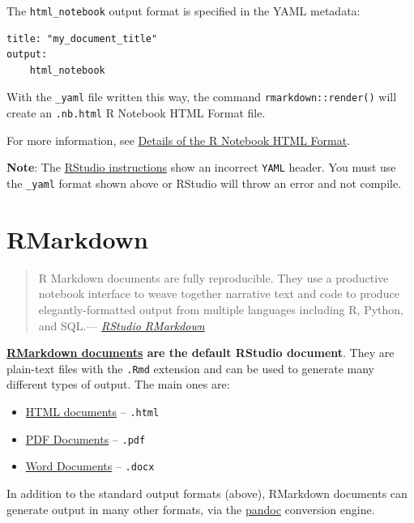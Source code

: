 \documentclass[]{book}
\providecommand{\tightlist}{%
  \setlength{\itemsep}{0pt}\setlength{\parskip}{0pt}}
\theoremstyle{definition}
\theoremstyle{definition}
\theoremstyle{definition}
\theoremstyle{remark}
\begin{document}
The \texttt{html\_notebook} output format is specified in the YAML
metadata:

\begin{verbatim}
title: "my_document_title"
output:
    html_notebook
\end{verbatim}

With the \texttt{\_yaml} file written this way, the command
\texttt{rmarkdown::render()} will create an \texttt{.nb.html} R Notebook
HTML Format file.

For more information, see
\href{https://rmarkdown.rstudio.com/r_notebook_format.html}{Details of
the R Notebook HTML Format}.

\textbf{Note}: The
\href{https://rmarkdown.rstudio.com/r_notebook_format.html\#generating-r-notebooks-with-custom-output}{RStudio
instructions} show an incorrect \texttt{YAML} header. You must use the
\texttt{\_yaml} format shown above or RStudio will throw an error and
not compile.

\hypertarget{rmarkdown}{%
\section{RMarkdown}\label{rmarkdown}}

\begin{quote}
R Markdown documents are fully reproducible. They use a productive
notebook interface to weave together narrative text and code to produce
elegantly-formatted output from multiple languages including R, Python,
and SQL.--- \href{https://rmarkdown.rstudio.com/}{\emph{RStudio
RMarkdown}}
\end{quote}

\textbf{\href{https://rmarkdown.rstudio.com/}{RMarkdown documents} are
the default RStudio document}. They are plain-text files with the
\texttt{.Rmd} extension and can be used to generate many different types
of output. The main ones are:

\begin{itemize}
\tightlist
\item
  \href{https://rmarkdown.rstudio.com/html_document_format.html}{HTML
  documents} -- \texttt{.html}
\item
  \href{https://rmarkdown.rstudio.com/pdf_document_format.html}{PDF
  Documents} -- \texttt{.pdf}
\item
  \href{https://rmarkdown.rstudio.com/word_document_format.html}{Word
  Documents} -- \texttt{.docx}
\end{itemize}

In addition to the standard output formats (above), RMarkdown documents
can generate output in many other formats, via the
\protect\hyperlink{pandoc}{pandoc} conversion engine.
\end{document}
